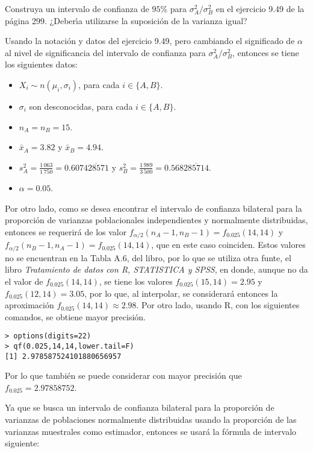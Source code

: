 \begin{enunciado}
 Construya un intervalo de confianza de $95\%$ para $\sigma_A^2/\sigma_B^2$ en el ejercicio 9.49 de la p\'agina 299. ¿Deber\'{\i}a utilizarse la suposici\'on de la varianza igual?
\end{enunciado}

\begin{solucion}
 Usando la notaci\'on y datos del ejercicio 9.49, pero cambiando el significado de $\alpha$ al nivel de significancia del intervalo de confianza para $\sigma_A^2/\sigma_B^2$, entonces se tiene los siguientes datos:
 \begin{itemize}
  \item $X_i \sim n\left( \mu_i, \sigma_i \right)$, para cada $i \in \{ A, B \}$.
  \item $\sigma_i$ son desconocidas, para cada $i \in \{ A, B \}$.
  \item $n_A = n_B = 15$.
  \item $\bar{x}_A = 3.82$ y  $\bar{x}_B = 4.94$.
  \item $s_A^2 = \frac{1\,063}{1\,750} = 0.607\overline{428571}$ y $s_B^2 = \frac{1\,989}{3\,500} = 0.568\overline{285714}$.
  \item $\alpha = 0.05$.
 \end{itemize}
 Por otro lado, como se desea encontrar el intervalo de confianza bilateral para la proporci\'on de varianzas poblacionales independientes y normalmente distribuidas, entonces se requerir\'a de los valor $f_{\alpha/2}(n_A - 1, n_B - 1) = f_{0.025}(14,14)$ y $f_{\alpha/2}(n_B-1,n_A-1) = f_{0.025}(14,14)$, que en este caso coinciden. Estos valores no se encuentran en la Tabla A.6, del libro, por lo que se utiliza otra funte, el libro \textit{Tratamiento de datos con R, STATISTICA y SPSS}, en donde, aunque no da el valor de $f_{0.025}(14,14)$, se tiene los valores $f_{0.025}(15,14) = 2.95$ y $f_{0.025}(12,14) = 3.05$, por lo que, al interpolar, se considerar\'a entonces la aproximaci\'on $f_{0.025}(14,14) \approx 2.98$. Por otro lado, usando R, con los siguientes comandos, se obtiene mayor precisi\'on.
 \begin{verbatim}
> options(digits=22)
> qf(0.025,14,14,lower.tail=F)
[1] 2.978587524101880656957
 \end{verbatim}
 \vspace{-0.5cm}
 Por lo que tambi\'en se puede considerar con mayor precisi\'on que $f_{0.025} = 2.97858752$.
 \par 
 Ya que se busca un intervalo de confianza bilateral para la proporci\'on de varianzas de poblaciones normalmente distribuidas usando la proporci\'on de las varianzas muestrales como estimador, entonces se usar\'a la f\'ormula de intervalo siguiente:

\end{solucion}
